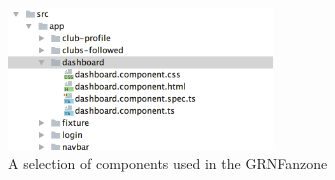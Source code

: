 \begin{figure}
\begin{center}
\includegraphics[width=7cm]{figures/frontend_components}
\end{center}
\caption{A selection of components used in the GRNFanzone}
\label{fig:frontend_components}
\end{figure}